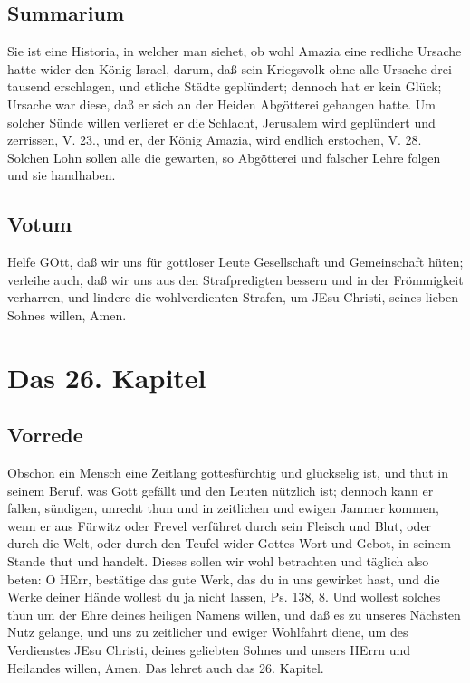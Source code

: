 \section{Summarium}

Sie ist eine Historia, in welcher man siehet, ob wohl Amazia eine redliche Ursache hatte wider den König Israel, darum, daß sein Kriegsvolk ohne alle Ursache drei tausend erschlagen, und etliche Städte geplündert; dennoch hat er kein Glück; Ursache war diese, daß er sich an der Heiden Abgötterei gehangen hatte. Um solcher Sünde willen verlieret er die Schlacht, Jerusalem wird geplündert und zerrissen, V. 23., und er, der König Amazia, wird endlich erstochen, V. 28. Solchen Lohn sollen alle die gewarten, so Abgötterei und falscher Lehre folgen und sie handhaben.

\section{Votum}

Helfe GOtt, daß wir uns für gottloser Leute Gesellschaft und Gemeinschaft hüten; verleihe auch, daß wir uns aus den Strafpredigten bessern und in der Frömmigkeit verharren, und lindere die wohlverdienten Strafen, um JEsu Christi, seines lieben Sohnes willen, Amen.

\chapter{Das 26. Kapitel}

\section{Vorrede}

Obschon ein Mensch eine Zeitlang gottesfürchtig und glückselig ist, und thut in seinem Beruf, was Gott gefällt und den Leuten nützlich ist; dennoch kann er fallen, sündigen, unrecht thun und in zeitlichen und ewigen Jammer kommen, wenn er aus Fürwitz oder Frevel verführet durch sein Fleisch und Blut, oder durch die Welt, oder durch den Teufel wider Gottes Wort und Gebot, in seinem Stande thut und handelt. Dieses sollen wir wohl betrachten und täglich also beten: O HErr, bestätige das gute Werk, das du in uns gewirket hast, und die Werke deiner Hände wollest du ja nicht lassen, Ps. 138, 8. Und wollest solches thun um der Ehre deines heiligen Namens willen, und daß es zu unseres Nächsten Nutz gelange, und uns zu zeitlicher und ewiger Wohlfahrt diene, um des Verdienstes JEsu Christi, deines geliebten Sohnes und unsers HErrn und Heilandes willen, Amen. Das lehret auch das 26. Kapitel.

